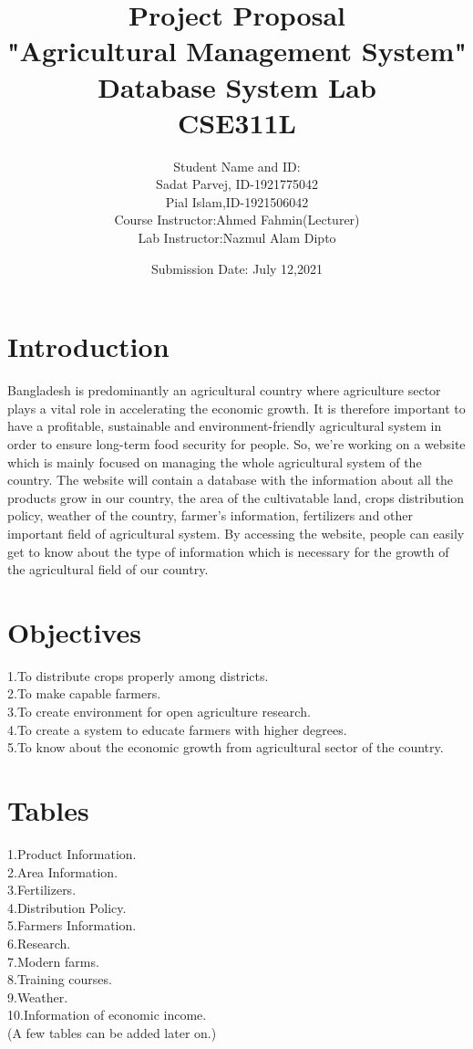 \documentclass{article}
\title{Project Proposal \\ "Agricultural Management System" \\ Database System Lab \\ CSE311L}
\author{Student Name and ID: \\ Sadat Parvej, ID-1921775042 \\ Pial Islam,ID-1921506042 \\ Course Instructor:Ahmed Fahmin(Lecturer) \\ Lab Instructor:Nazmul Alam Dipto}
\date{Submission Date: July 12,2021}
\begin{document}
\maketitle
\newpage

\section{Introduction}
Bangladesh is predominantly an agricultural country where agriculture sector plays a vital role in accelerating the economic growth. It is therefore important to have a profitable, sustainable and environment-friendly agricultural system in order to ensure long-term food security for people. So, we're working on a website which is mainly focused on managing the whole agricultural system of the country. The website will contain a database with the information about all the products grow in our country, the area of the cultivatable land, crops distribution policy, weather of the country, farmer's information, fertilizers and other important field of agricultural system. By accessing the website, people can easily get to know about the type of information which is necessary for the growth of the agricultural field of our country.

\section{Objectives}
1.To distribute crops properly among districts.\\
2.To make capable farmers.\\ 
3.To create environment for open agriculture research.\\ 
4.To create a system to educate farmers with higher degrees.\\ 
5.To know about the economic growth from agricultural sector of the country.\\ 

\section{Tables}
1.Product Information.\\ 
2.Area Information. \\
3.Fertilizers. \\
4.Distribution Policy. \\
5.Farmers Information. \\
6.Research. \\
7.Modern farms. \\
8.Training courses. \\
9.Weather. \\
10.Information of economic income. \\
(A few tables can be added later on.) 
\end{document}

